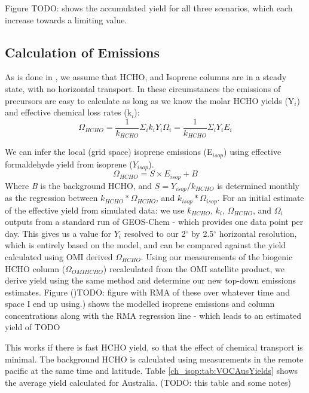     Figure TODO: shows the accumulated yield for all three scenarios, which each increase towards a limiting value.
    
  \subsection{Calculation of Emissions}
    \label{ch_isop:sec:EmissionCalculation}
    As is done in \citet{Palmer2003, Millet2006, Bauwens2016}, we assume that HCHO, and Isoprene columns are in a steady state, with no horizontal transport.
    In these circumstances the emissions of precursors are easy to calculate as long as we know the molar HCHO yields (Y$_i$) and effective chemical loss rates (k$_i$):
    \begin{equation}
      \Omega_{HCHO} = \frac{1}{k_{HCHO}}\Sigma_i k_i Y_i \Omega_i = \frac{1}{k_{HCHO}}\Sigma_i Y_i E_i
    \end{equation}
    
    We can infer the local (grid space) isoprene emissions (E$_{isop}$) using effective formaldehyde yield from isoprene ($Y_{isop}$).
    \begin{equation} \label{ch_isop:eqn:isop_yield}
      \Omega_{HCHO} = S \times E_{isop} + B
    \end{equation}
    Where \textit{B} is the background HCHO, and $S = Y_{isop}/k_{HCHO}$ is determined monthly as the regression between $k_{HCHO}*\Omega_{HCHO}$, and $k_{isop}*\Omega_{isop}$.
    For an initial estimate of the effective yield from simulated data: we use $k_{HCHO}$, $k_{i}$, $\Omega_{HCHO}$, and $\Omega_i$ outputs from a standard run of GEOS-Chem - which provides one data point per day.
    This gives us a value for $Y_i$ resolved to our 2$^{\circ}$ by 2.5$^{\circ}$ horizontal resolution, which is entirely based on the model, and can be compared against the yield calculated using OMI derived $\Omega_{HCHO}$.
    Using our measurements of the biogenic HCHO column ($\Omega_{OMIHCHO}$) recalculated from the OMI satellite product, we derive yield using the same method and determine our new top-down emissions estimates.
    Figure ()TODO: figure with RMA of these over whatever time and space I end up using.) shows the modelled isoprene emissions and column concentrations along with the RMA regression line - which leads to an estimated yield of TODO
    
    This works if there is fast HCHO yield, so that the effect of chemical transport is minimal.
    The background HCHO is calculated using measurements in the remote pacific at the same time and latitude.
    Table \ref{ch_isop:tab:VOCAusYields} shows the average yield calculated for Australia. (TODO: this table and some notes)
    
